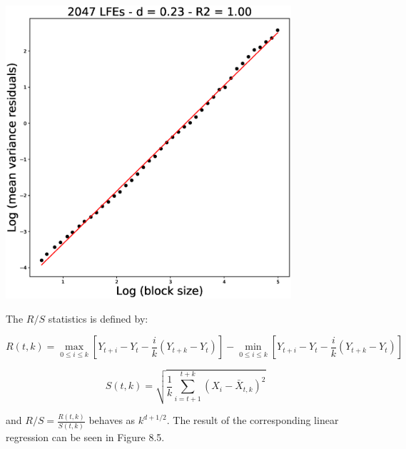 \documentclass[workdone.tex]{subfiles}
\begin{document}
\begin{center}
\includegraphics[width=300pt, trim={0cm 0cm 0cm 0cm},clip]{Figures/longrange/varianceresiduals.eps}
\captionsetup{type=figure}
\end{center}

The $R / S$ statistics is defined by:

\begin{equation}
R \left( t , k \right) = \max_{0 \leq i \leq k} \left[ Y_{t + i} - Y_t - \frac{i}{k} \left( Y_{t + k} - Y_t \right) \right] - \min_{0 \leq i \leq k} \left[ Y_{t + i} - Y_t - \frac{i}{k} \left( Y_{t + k} - Y_t \right) \right]
\end{equation}

\begin{equation}
S \left( t , k \right) = \sqrt{ \frac{1}{k} \sum_{i = t + 1}^{t + k} \left( X_i - \bar{X}_{t , k} \right) ^2 }
\end{equation}

and $R / S = \frac{R \left( t , k \right)}{S \left( t , k \right)}$ behaves as $k^{d + 1 / 2}$. The result of the corresponding linear regression can be seen in Figure 8.5.
\end{document}
